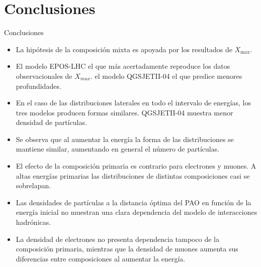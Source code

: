 \documentclass[11pt,table,compress]{beamer}
\begin{document}
\section{Conclusiones}
\begin{frame}{Conclusiones}
	\begin{itemize}
	\item La hipótesis de la composición mixta es apoyada por los resultados de $X_{\text{max}}$. \vspace{3 mm}
	\item El modelo EPOS-LHC el que más acertadamente reproduce los datos observacionales de $X_{max}$. el modelo QGSJETII-04 el que predice menores profundidades.
	\end{itemize}
\end{frame}

\begin{frame}
	\begin{itemize}
	\item En el caso de las distribuciones laterales en todo el intervalo de energías, los tres modelos producen formas similares. QGSJETII-04 muestra menor densidad de partículas.\vspace{3 mm}
	\item Se observa que al aumentar la energía la forma de las distribuciones se mantiene similar, aumentando en general el número de partículas. \vspace{3 mm}
	\item El efecto de la composición primaria es contrario para electrones y muones. A altas energías primarias las distribuciones de distintas composiciones casi se sobrelapan.
	\end{itemize}
\end{frame}

\begin{frame}
	\begin{itemize}
	\item Las densidades de partículas a la distancia óptima del PAO en función de la energía inicial no muestran una clara dependencia del modelo de interacciones hadrónicas.\vspace{3 mm}
	
	\item La densidad de electrones no presenta dependencia tampoco de la composición primaria, mientras que la densidad de muones aumenta sus diferencias entre composiciones al aumentar la energía.
	\end{itemize}
\end{frame}
\end{document}
